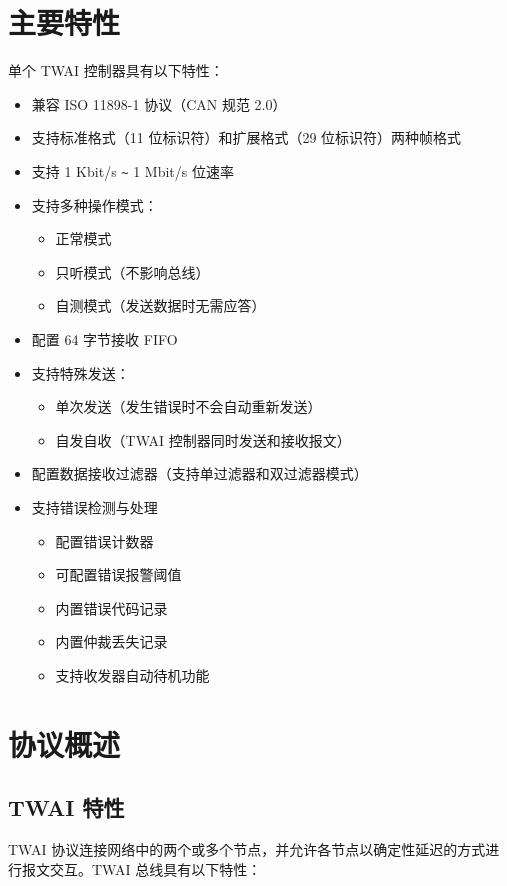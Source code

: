 \documentclass[main\_\_CN.tex]{subfiles}
\begin{document}
\section{主要特性}
\chipname{} 单个 TWAI 控制器具有以下特性：
\begin{itemize}
    \item 兼容 ISO 11898-1 协议（CAN 规范 2.0）
    \item 支持标准格式（11 位标识符）和扩展格式（29 位标识符）两种帧格式
    \item 支持 1 Kbit/s \verb+~+ 1 Mbit/s 位速率
    \item 支持多种操作模式：
    \begin{itemize}
        \item 正常模式
        \item 只听模式（不影响总线）
        \item 自测模式（发送数据时无需应答）
    \end{itemize}
    \item 配置 64 字节接收 FIFO
    \item 支持特殊发送：
    \begin{itemize}
        \item 单次发送（发生错误时不会自动重新发送）
        \item 自发自收（TWAI 控制器同时发送和接收报文）
    \end{itemize}
    \item 配置数据接收过滤器（支持单过滤器和双过滤器模式）
    \item 支持错误检测与处理
    \begin{itemize}
        \item 配置错误计数器
        \item 可配置错误报警阈值
        \item 内置错误代码记录
        \item 内置仲裁丢失记录
    \end{itemize}
    \begin{itemize}
        \item 支持收发器自动待机功能
    \end{itemize}
\end{itemize}

\section{协议概述}
\label{sec:twai-functional-protocol}
\subsection{TWAI 特性}
TWAI 协议连接网络中的两个或多个节点，并允许各节点以确定性延迟的方式进行报文交互。TWAI 总线具有以下特性：
\end{document}
